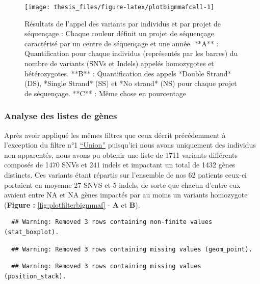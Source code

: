 \documentclass[12pt,twoside]{reedthesis}
\theoremstyle{definition}
\theoremstyle{definition}
\theoremstyle{remark}
\begin{document}
  \newpage
  
  \begin{figure}
  
  {\centering \texttt{[image: thesis\_files/figure-latex/plotbigmmafcall-1]} 
  
  }
  
  \caption[Résultats de l'appel des variants par individus et par projet de séquençage]{Résultats de l'appel des variants par individus et par projet de séquençage : Chaque couleur définit un projet de séquençage caractérisé par un centre de séquençage et une année. **A** : Quantification pour chaque individus (représentés par les barres) du nombre de variants (SNVs et Indels) appelés homozygotes et hétérozygotes. **B** : Quantification des appels *Double Strand* (DS), *Single Strand* (SS) et *No strand* (NS) pour chaque projet de séquençage. **C** : Même chose en pourcentage}\label{fig:plotbigmmafcall}
  \end{figure}
  
  \newpage
  
  \subsubsection{Analyse des listes de
  gènes}\label{analyse-des-listes-de-genes}
  
  Après avoir appliqué les mêmes filtres que ceux décrit précédemment à
  l'exception du filtre n°1
  \protect\hyperlink{filterdescription}{``Union''} puisqu'ici nous avons
  uniquement des individus non apparentés, nous avons pu obtenir une liste
  de 1711 variants différents composés de 1470 SNVs et 241 indels et
  impactant un total de 1432 gènes distincts. Ces variants étant répartis
  sur l'ensemble de nos 62 patients ceux-ci portaient en moyenne 27 SNVS
  et 5 indels, de sorte que chacun d'entre eux avaient entre NA et NA
  gènes impactés par au moins un variants homozygote (\textbf{Figure :
  }\ref{fig:plotfilterbigmmaf} - \textbf{A} et \textbf{B}).
  
  \begin{verbatim}
  ## Warning: Removed 3 rows containing non-finite values (stat_boxplot).
  \end{verbatim}
  
  \begin{verbatim}
  ## Warning: Removed 3 rows containing missing values (geom_point).
  \end{verbatim}
  
  \begin{verbatim}
  ## Warning: Removed 3 rows containing missing values (position_stack).
  \end{verbatim}
  
\end{document}

